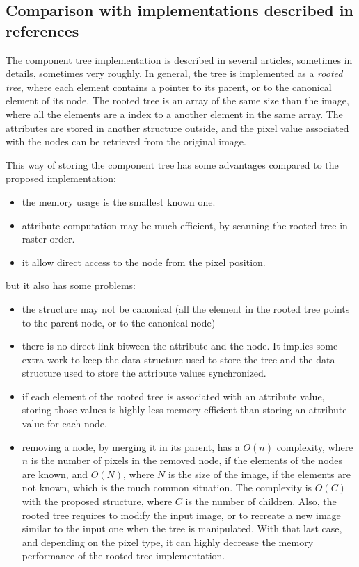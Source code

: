 \documentclass{InsightArticle}
\begin{document}
  \subsection{Comparison with implementations described in references}

The component tree implementation is described in several articles, sometimes in details, sometimes very roughly.
In general, the tree is implemented as a {\em rooted tree}, where each element contains a pointer to its parent, or to the canonical element of its node. The rooted tree is an array of the same size than the image, where all the elements are a index to a another element in the same array. The attributes are stored in another structure outside, and the pixel value associated with the nodes can be retrieved from the original image.

This way of storing the component tree has some advantages compared to the proposed implementation:
\begin{itemize}
  \item the memory usage is the smallest known one.
  \item attribute computation may be much efficient, by scanning the rooted tree in raster order.
  \item it allow direct access to the node from the pixel position.
\end{itemize}
but it also has some problems:
\begin{itemize}
  \item the structure may not be canonical (all the element in the rooted tree points to the parent node, or to the canonical node)
  \item there is no direct link bitween the attribute and the node. It implies some extra work to keep the data structure used to store the tree and the data structure used to store the attribute values synchronized.
  \item if each element of the rooted tree is associated with an attribute value, storing those values is highly less memory efficient than storing an attribute value for each node.
  \item removing a node, by merging it in its parent, has a $O(n)$ complexity, where $n$ is the number of pixels in the removed node, if the elements of the nodes are known, and $O(N)$, where $N$ is the size of the image, if the elements are not known, which is the much common situation. The complexity is $O(C)$ with the proposed structure, where $C$ is the number of children. Also, the rooted tree requires to modify the input image, or to recreate a new image similar to the input one when the tree is manipulated. With that last case, and depending on the pixel type, it can highly decrease the memory performance of the rooted tree implementation.
\end{itemize}
\end{document}

